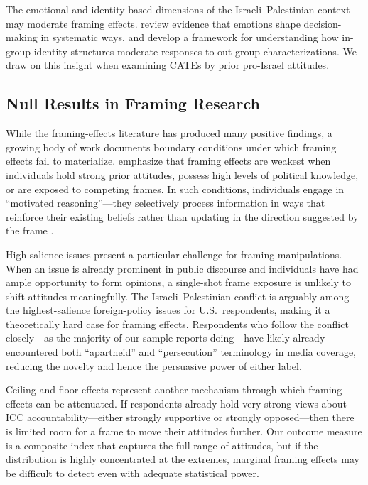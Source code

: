 \documentclass[12pt]{article}
\begin{document}
The emotional and identity-based dimensions of the Israeli--Palestinian context may moderate framing effects. \citet{lerner2015emotion} review evidence that emotions shape decision-making in systematic ways, and \citet{glick1996ambivalent} develop a framework for understanding how in-group identity structures moderate responses to out-group characterizations. We draw on this insight when examining CATEs by prior pro-Israel attitudes.

\subsection{Null Results in Framing Research}

While the framing-effects literature has produced many positive findings, a growing body of work documents boundary conditions under which framing effects fail to materialize. \citet{chong2007framing} emphasize that framing effects are weakest when individuals hold strong prior attitudes, possess high levels of political knowledge, or are exposed to competing frames. In such conditions, individuals engage in ``motivated reasoning''---they selectively process information in ways that reinforce their existing beliefs rather than updating in the direction suggested by the frame \citep{druckman2001implications}.

High-salience issues present a particular challenge for framing manipulations. When an issue is already prominent in public discourse and individuals have had ample opportunity to form opinions, a single-shot frame exposure is unlikely to shift attitudes meaningfully. The Israeli--Palestinian conflict is arguably among the highest-salience foreign-policy issues for U.S.\ respondents, making it a theoretically hard case for framing effects. Respondents who follow the conflict closely---as the majority of our sample reports doing---have likely already encountered both ``apartheid'' and ``persecution'' terminology in media coverage, reducing the novelty and hence the persuasive power of either label.

Ceiling and floor effects represent another mechanism through which framing effects can be attenuated. If respondents already hold very strong views about ICC accountability---either strongly supportive or strongly opposed---then there is limited room for a frame to move their attitudes further. Our outcome measure is a composite index that captures the full range of attitudes, but if the distribution is highly concentrated at the extremes, marginal framing effects may be difficult to detect even with adequate statistical power.
\end{document}

